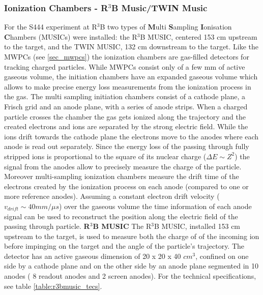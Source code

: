 \subsubsection{Ionization Chambers - R$^3$B Music/TWIN Music}\label{sec:ionisation_chambers}
For the S444 experiment at R$^3$B two types of \textbf{M}ulti \textbf{S}ampling \textbf{I}onisation \textbf{C}hambers (MUSICs) were installed: the R$^3$B MUSIC, centered 153 cm upstream to the target, and the TWIN MUSIC, 132 cm downstream to the target. Like the MWPCs (see \ref{sec_mwpcs}) the ionization chambers are gas-filled detectors for tracking charged particles. While MWPCs consist only of a few mm of active gaseous volume, the initiation chambers have an expanded gaseous volume which allows to make precise energy loss measurements from the ionization process in the gas. The multi sampling initiation chambers consist of a cathode plane, a Frisch grid  and an anode plane, with a series of anode strips. When a charged particle crosses the chamber the gas gets ionized along the trajectory and the created electrons and ions are separated by the strong electric field. While the ions drift towards the cathode plane the electrons move to the anodes where each anode is read out separately. Since the energy loss of the passing through fully stripped ions is proportional to the square of its nuclear charge ($\Delta E \sim Z^2$) the signal from the anodes allow to precisely measure the charge of the particle. Moreover multi-sampling ionization chambers measure the drift time of the electrons created by the ionization process  on each anode (compared to one or more reference anodes). Assuming a constant electron drift velocity ($ v_{drift} \sim 40 mm/\mu s$) over the gaseous volume the time information of each anode signal can be used to reconstruct the position along the electric field of the passing through particle.\newline
\textbf{R$^3$B MUSIC}\newline
The R$^3$B MUSIC, installed 153 cm upstream to the target, is used to measure both the  charge of of the incoming ion before impinging on the target and the angle of the particle's trajectory. The detector has an active gaseous dimension of 20 x 20 x 40 $cm^3$, confined on one side by a cathode plane and on the other side by an anode plane segmented in 10 anodes ( 8 readout anodes and 2 screen anodes). For the technical specifications, see table \ref{table:r3bmusic_tecs}. \newline

